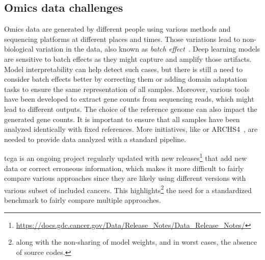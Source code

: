 \documentclass[../main.tex]{subfiles}
\begin{document}
	\subsection{Omics data challenges}
		Omics data are generated by different people using various methods and sequencing platforms at different places and times.
		Those variations lead to non-biological variation in the data, also known as \emph{batch effect}~\cite{Leek2010}.
		Deep learning models are sensitive to batch effects as they might capture and amplify those artifacts.
		Model interpretability can help detect such cases, but there is still a need to consider batch effects better by correcting them or adding domain adaptation tasks to ensure the same representation of all samples.
		Moreover, various tools have been developed to extract gene counts from sequencing reads, which might lead to different outputs.
		The choice of the reference genome can also impact the generated gene counts.
		It is important to ensure that all samples have been analyzed identically with fixed references.
		More initiatives, like  or ARCHS4~\cite{Lachmann2018}, are needed to provide data analyzed with a standard pipeline.

		\Gls{tcga} is an ongoing project regularly updated with new releases\footnote{\url{https://docs.gdc.cancer.gov/Data/Release_Notes/Data_Release_Notes/}} that add new data or correct erroneous information, which makes it more difficult to fairly compare various approaches since they are likely using different versions with various subset of included cancers.
		This highlights\footnote{along with the non-sharing of model weights, and in worst cases, the absence of source codes.} the need for a standardized benchmark to fairly compare multiple approaches.
\end{document}
